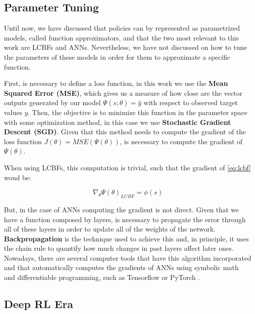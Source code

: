 \subsection{Parameter Tuning}

Until now, we have discussed that policies can by represented as parametrized models, called function approximators, and that the two most relevant to this work are LCBFs and ANNs. Nevertheless, we have not discussed on how to tune the parameters of these models in order for them to approximate a specific function.

First, is necessary to define a loss function, in this work we use the \textbf{Mean Squared Error (MSE)}, which gives us a measure of how close are the vector outputs generated by our model $\Psi(s;\theta)=\hat{y}$ with respect to observed target values $y$. Then, the objective is to minimize this function in the parameter space with some optimization method, in this case we use \textbf{Stochastic Gradient Descent (SGD)}. Given that this method needs to compute the gradient of the loss function $J(\theta)=MSE(\Psi(\theta))$, is necessary to compute the gradient of $\Psi(\theta)$.

When using LCBFs, this computation is trivial, such that the gradient of \ref{eq:lcbf} woud be:

\begin{equation}
    \nabla_{\theta} \Psi(\theta)_{LCBF} = \phi(s)
\end{equation}

But, in the case of ANNs computing the gradient is not direct. Given that we have a function composed by layers, is necessary to propagate the error through all of these layers in order to update all of the weights of the network. \textbf{Backpropagation} \cite{rumelhart1988learning} is the technique used to achieve this and, in principle, it uses the chain rule to quantify how much changes in past layers affect later ones. Nowadays, there are several computer tools that have this algorithm incorporated and that automatically computes the gradients of ANNs using symbolic math and differentiable programming, such as Tensorflow \cite{tensorflow2015-whitepaper} or PyTorch \cite{paszke2017automatic}.

\subsection{Deep RL Era}

